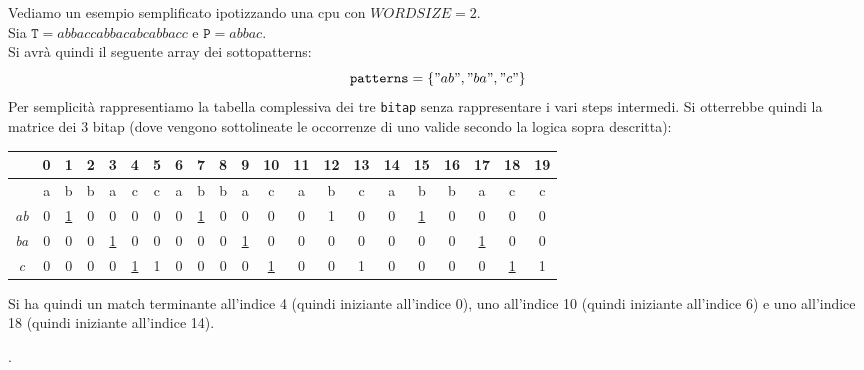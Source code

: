 \documentclass[a4paper,12pt, oneside]{article}
\begin{document}
\begin{esempio}
  Vediamo un esempio semplificato ipotizzando una cpu con
  $WORDSIZE=2$.\\
  Sia $\mathtt{T}=abbaccabbacabcabbacc$ e $\mathtt{P}=abbac$.\\
  Si avrà quindi il seguente array dei sottopatterns:
  \[\mathtt{patterns}=\{"ab", "ba", "c"\}\]
  Per semplicità rappresentiamo la tabella complessiva dei tre
  \texttt{bitap} senza rappresentare i vari steps intermedi. Si
  otterrebbe quindi la matrice dei 3 bitap (dove vengono sottolineate
  le occorrenze di uno valide secondo la logica sopra descritta):
  \begin{center}
    \begin{tabular}{|c|c|c|c|c|c|c|c|c|c|c|c|c|c|c|c|c|c|c|c|c|}
      \hline
      & 0 & 1 & 2 & 3 & 4 & 5 & 6 & 7 & 8 & 9 & 10 & 11 & 12 & 13 &
                                                                    14
      & 15 & 16 & 17 & 18 & 19 \\ \hline
      & a & b & b & a & c & c & a & b & b & a & c & a & b & c & a &
                                                                    b
           & b & a & c & c \\ \hline\hline  
      \textit{ab} & 0 & \underline{1} & 0 & 0 & 0 & 0 & 0 &
                                                            \underline{1}
                                      & 0
                                          & 
                                            0
                                              & 0 & 0 & 1 & 0 & 0 &
                                                                    \underline{1} 
           & 0 & 0 & 0 & 0 \\ \hline   
      \textit{ba} & 0 & 0 & 0 & \underline{1} & 0 & 0 & 0 & 0 & 0 &
                                                                    \underline{1}
                                                                    
                                              & 0 & 0 & 0 & 0 & 0 &
                                                                    0
           & 0 & \underline{1} & 0 & 0 \\ \hline   
      \textit{c} & 0 & 0 & 0 & 0 & \underline{1} & 1 & 0 & 0 & 0 & 0
                                              & \underline{1} & 0 &
                                                                    0 & 1 & 0 & 
                                                                                0
           & 0 & 0 & \underline{1} & 1 \\ \hline
    \end{tabular}

  \end{center}
  Si ha quindi un match terminante all'indice 4 (quindi iniziante all'indice
  0), uno all'indice 10 (quindi iniziante all'indice 6)
  e uno all'indice 18 (quindi iniziante all'indice 14).
\end{esempio}.
\end{document}
